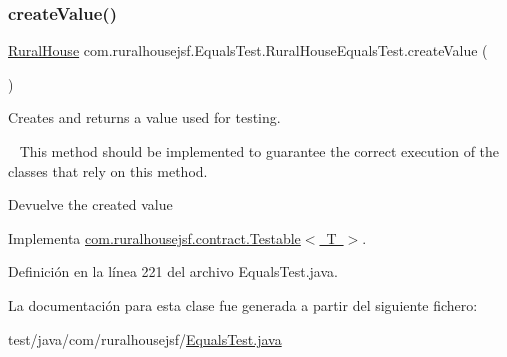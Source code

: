 \mbox{\label{classcom_1_1ruralhousejsf_1_1_equals_test_1_1_rural_house_equals_test_abcab55b3e63c8d5511f04e395ff0f111}} 
\subsubsection{\texorpdfstring{createValue()}{createValue()}}
{\footnotesize\ttfamily \mbox{\hyperlink{classcom_1_1ruralhousejsf_1_1domain_1_1_rural_house}{Rural\+House}} com.\+ruralhousejsf.\+Equals\+Test.\+Rural\+House\+Equals\+Test.\+create\+Value (\begin{DoxyParamCaption}{ }\end{DoxyParamCaption})}



Creates and returns a value used for testing. 

~\newline
 This method should be implemented to guarantee the correct execution of the classes that rely on this method.

\begin{DoxyReturn}{Devuelve}
the created value 
\end{DoxyReturn}


Implementa \mbox{\hyperlink{interfacecom_1_1ruralhousejsf_1_1contract_1_1_testable_ae4546a381488faaba1ef7c0f8688de9c}{com.\+ruralhousejsf.\+contract.\+Testable$<$ T $>$}}.



Definición en la línea 221 del archivo Equals\+Test.\+java.



La documentación para esta clase fue generada a partir del siguiente fichero\+:\begin{DoxyCompactItemize}
\item 
test/java/com/ruralhousejsf/\mbox{\hyperlink{_equals_test_8java}{Equals\+Test.\+java}}\end{DoxyCompactItemize}
